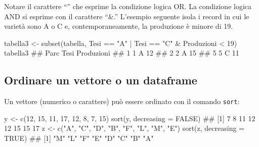\documentclass[a4paper,12pt,oneside]{book}
\newenvironment{Shaded}{\begin{snugshade}}{\end{snugshade}}
\newcommand{\DecValTok}[1]{#1}
\newcommand{\ConstantTok}[1]{#1}
\newcommand{\SpecialCharTok}[1]{#1}
\newcommand{\StringTok}[1]{#1}
\newcommand{\DocumentationTok}[1]{#1}
\newcommand{\OtherTok}[1]{#1}
\newcommand{\FunctionTok}[1]{#1}
\newcommand{\AttributeTok}[1]{#1}
\newcommand{\NormalTok}[1]{#1}
\begin{document}
Notare il carattere ``\textbar{}'' che esprime la condizione logica OR. La condizione logica AND si esprime con il carattere ``\&.'' L'esempio seguente isola i record in cui le varietà sono A o C e, contemporaneamente, la produzione è minore di 19.

\begin{Shaded}
\begin{Highlighting}[]
\NormalTok{tabella3  }\OtherTok{\textless{}{-}}  \FunctionTok{subset}\NormalTok{(tabella, Tesi }\SpecialCharTok{==} \StringTok{"A"} \SpecialCharTok{|}\NormalTok{ Tesi }\SpecialCharTok{==} \StringTok{"C"} \SpecialCharTok{\&} 
\NormalTok{                       Produzioni }\SpecialCharTok{\textless{}} \DecValTok{19}\NormalTok{)}
\NormalTok{tabella3}
\DocumentationTok{\#\#   Parc Tesi Produzioni}
\DocumentationTok{\#\# 1    1    A         12}
\DocumentationTok{\#\# 2    2    A         15}
\DocumentationTok{\#\# 5    5    C         11}
\end{Highlighting}
\end{Shaded}

\hypertarget{ordinare-un-vettore-o-un-dataframe}{%
\subsection*{Ordinare un vettore o un dataframe}\label{ordinare-un-vettore-o-un-dataframe}}

Un vettore (numerico o carattere) può essere ordinato con il comando \texttt{sort}:

\begin{Shaded}
\begin{Highlighting}[]
\NormalTok{y  }\OtherTok{\textless{}{-}}  \FunctionTok{c}\NormalTok{(}\DecValTok{12}\NormalTok{, }\DecValTok{15}\NormalTok{, }\DecValTok{11}\NormalTok{, }\DecValTok{17}\NormalTok{, }\DecValTok{12}\NormalTok{, }\DecValTok{8}\NormalTok{, }\DecValTok{7}\NormalTok{, }\DecValTok{15}\NormalTok{)}
\FunctionTok{sort}\NormalTok{(y, }\AttributeTok{decreasing =} \ConstantTok{FALSE}\NormalTok{)}
\DocumentationTok{\#\# [1]  7  8 11 12 12 15 15 17}
\NormalTok{z  }\OtherTok{\textless{}{-}}  \FunctionTok{c}\NormalTok{(}\StringTok{"A"}\NormalTok{, }\StringTok{"C"}\NormalTok{, }\StringTok{"D"}\NormalTok{, }\StringTok{"B"}\NormalTok{, }\StringTok{"F"}\NormalTok{, }\StringTok{"L"}\NormalTok{, }\StringTok{"M"}\NormalTok{, }\StringTok{"E"}\NormalTok{)}
\FunctionTok{sort}\NormalTok{(z, }\AttributeTok{decreasing =} \ConstantTok{TRUE}\NormalTok{)}
\DocumentationTok{\#\# [1] "M" "L" "F" "E" "D" "C" "B" "A"}
\end{Highlighting}
\end{Shaded}
\end{document}
